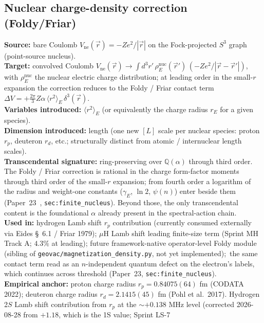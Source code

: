 \documentclass[11pt]{article}
\begin{document}
\subsection{Nuclear charge-density correction (Foldy/Friar)}
\label{sec:proj_charge_density}
\textbf{Source:} bare Coulomb $V_\text{ne}(\vec{r}) = -Z e^2 / |\vec{r}|$
on the Fock-projected $S^3$ graph (point-source nucleus).\\
\textbf{Target:} convolved Coulomb $V_\text{ne}(\vec{r}) \to \int
d^3r' \, \rho_E^\text{nuc}(\vec{r}')\,(-Ze^2/|\vec{r}-\vec{r}'|)$,
with $\rho_E^\text{nuc}$ the nuclear electric charge distribution; at
leading order in the small-$r$ expansion the correction reduces to
the Foldy / Friar contact term
$\Delta V = +\tfrac{2\pi}{3} Z\alpha\,\langle r^2\rangle_E\,\delta^3(\vec{r})$.\\
\textbf{Variables introduced:} $\langle r^2\rangle_E$ (or
equivalently the charge radius $r_E$ for a given species).\\
\textbf{Dimension introduced:} length (one new $[L]$ scale per
nuclear species: proton $r_p$, deuteron $r_d$, etc.; structurally
distinct from atomic / internuclear length scales).\\
\textbf{Transcendental signature:} ring-preserving over
$\mathbb{Q}(\alpha)$ through third order.  The Foldy / Friar correction is rational in
the charge form-factor moments through third order of the small-$r$
expansion; from fourth order a logarithm of the radius and weight-one
constants ($\gamma_E$, $\ln 2$, $\psi(n)$) enter beside them
(Paper~23~\cite{paper23}, \texttt{sec:finite\_nucleus}).  Beyond those, the only
transcendental content is the foundational
$\alpha$ already present in the spectral-action chain.\\
\textbf{Used in:} hydrogen Lamb shift $r_p$ contribution (currently
consumed externally via Eides \S~6.1 / Friar 1979); $\mu$H Lamb
shift leading finite-size term (Sprint MH Track A; $4.3\%$ at
leading); future framework-native operator-level Foldy module
(sibling of \texttt{geovac/magnetization\_density.py}, not yet
implemented);\ the same contact term read as an $n$-independent quantum
defect on the electron's labels, which continues across threshold
(Paper~23, \texttt{sec:finite\_nucleus}).\\
\textbf{Empirical anchor:} proton charge radius
$r_p = 0.84075(64)$ fm (CODATA 2022); deuteron charge radius
$r_d = 2.1415(45)$ fm (Pohl et al.~2017).  Hydrogen 2$S$ Lamb shift
contribution from $r_p$ at the $\sim +0.138$ MHz level (corrected
2026-08-28 from $+1.18$, which is the 1S value; Sprint LS-7
\end{document}
